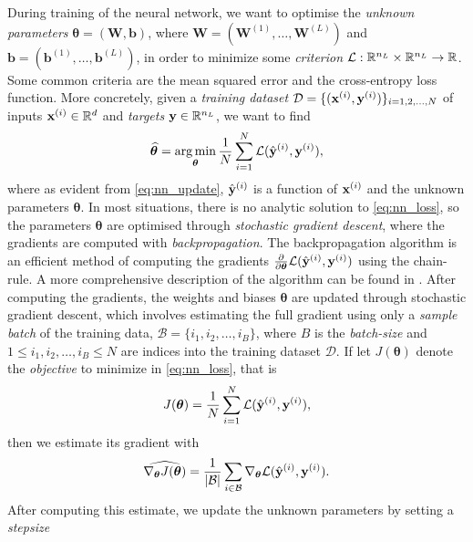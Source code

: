 \documentclass{statsmsc}
\begin{document}
{During training of the neural network, we want to optimise the \textit{unknown
parameters} $\bm{\theta}=(\mathbf{W}, \mathbf{b})$, where
$\mathbf{W}=\left(\boldsymbol{W}^{(1)},\dots,\boldsymbol{W}^{(L)}\right)$ and
$\mathbf{b}=\left(\boldsymbol{b}^{(1)},\dots,\boldsymbol{b}^{(L)}\right)$, in
order to minimize some \textit{criterion} $\mathcal{L}: \mathbb{R}^{n_L} \times \mathbb{R}^{n_L}
\rightarrow {\mathbb{R}}$. Some common criteria are the mean squared error and the
cross-entropy loss function.
More concretely, given a \textit{training dataset }
$\mathcal{D}=\{(\mathbf{x}^{(i)}, \mathbf{y}^{(i)})\}_{i=1,2,\dots,N}$ of inputs
$\mathbf{x}^{(i)} \in \mathbb{R}^d$ and \textit{targets} $\mathbf{y} \in \mathbb{R}^{n_L}$, we want to find
\begin{equation}\label{eq:nn_loss}
    \widehat{\bm\theta}= \operatorname*{arg\,min}_{\bm\theta}
    \frac{1}{N}  \sum^{N}_{i=1} \mathcal{L}(\hat{\mathbf{y}}^{(i)}, \mathbf{y}^{(i)}),
\end{equation}
where as evident from \cref{eq:nn_update}, $\hat{\mathbf{y}}^{(i)}$ is a function of
$\mathbf{x}^{(i)}$ and the unknown parameters $\bm\theta$.
In most situations, there is no analytic solution to \cref{eq:nn_loss}, so
the parameters $\bm\theta$ are optimised through \textit{stochastic gradient descent},
where the gradients are computed with \textit{backpropagation}.
The backpropagation algorithm is an efficient method of computing the gradients
$\frac{\partial }{\partial \bm\theta} \mathcal{L}(\hat{\mathbf{y}}^{(i)}, \mathbf{y}^{(i)}) $
using the chain-rule. A more comprehensive description of the algorithm can be
found in \citep{backprop}.
After computing the gradients, the weights and biases $\bm\theta$ are updated through
stochastic gradient descent, which involves estimating
the full gradient using only a \textit{sample batch} of the training data,
$\mathcal{B}=\{i_1,i_2,\dots,i_B\}$, where $B$ is the \textit{batch-size} and
$1\leq i_1,i_2,\dots,i_B \leq N$ are indices into the training dataset $\mathcal{D}$.
If let $J(\bm\theta)$ denote the \textit{objective} to minimize in \cref{eq:nn_loss}, that is
\begin{equation}
    J(\bm\theta)=\frac{1}{N} \sum^{N}_{i=1} \mathcal{L}(\hat{\mathbf{y}}^{(i)}, {\mathbf{y}}^{(i)}),
\end{equation}
then we estimate its gradient with
\begin{equation}
    \widehat{\nabla_{\bm\theta} J(\bm\theta)} = \frac{1}{|\mathcal{B}|} \sum_{i \in \mathcal{B}}
    \nabla_{\bm\theta} \mathcal{L}(\hat{\mathbf{y}}^{(i)}, {\mathbf{y}}^{(i)}).
\end{equation}
After computing this estimate, we update the unknown parameters by setting a \textit{stepsize}
}
\end{document}
